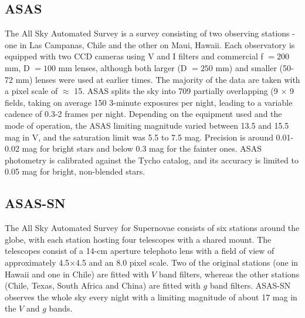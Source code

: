 \documentclass{aa}
\begin{document}
\subsection{ASAS}

The All Sky Automated Survey \citep[ASAS; ][]{pojmanski_all_1997, asas_2005, asas_2018} is a survey consisting of two observing stations - one in Las Campanas, Chile and the other on Maui, Hawaii. 
%
Each observatory is equipped with two CCD cameras using V and I filters and commercial f $ = 200$ mm, D $= 100$ mm lenses, although both larger (D $=250$ mm) and smaller (50-72 mm) lenses were used at earlier times.
%
The majority of the data are taken with a pixel scale of $\approx$ 15\arcsec{}.
%
ASAS splits the sky into 709 partially overlapping (9\degr{} $\times$ 9\degr{} fields, taking on average 150 3-minute exposures per night, leading to a variable cadence of 0.3-2 frames per night.
%
Depending on the equipment used and the mode of operation, the ASAS limiting magnitude varied between 13.5 and 15.5 mag in V, and the saturation limit was 5.5 to 7.5 mag. 
%
Precision is around 0.01-0.02 mag for bright stars and below 0.3 mag for the fainter ones. 
%
ASAS photometry is calibrated against the Tycho catalog, and its accuracy is limited to 0.05 mag for bright, non-blended stars.

\subsection{ASAS-SN}

The All Sky Automated Survey for Supernovae \citep[ASAS-SN; ][]{shappee_man_2014,kochanek_all-sky_2017} consists of six stations around the globe, with each station hosting four telescopes with a shared mount.
%
The telescopes consist of a 14-cm aperture telephoto lens with a field of view of approximately 4.5\degr{}$\times$4.5\degr{} and an 8.0\arcsec{} pixel scale.
% 
Two of the original stations (one in Hawaii and one in Chile) are fitted with $V$ band filters, whereas the other stations (Chile, Texas, South Africa and China) are fitted with $g$ band filters.
%
ASAS-SN observes the whole sky every night with a limiting magnitude of about 17 mag in the $V$ and $g$ bands.
%

\end{document}

